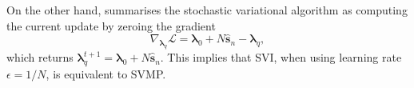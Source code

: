 \documentclass{article} %
\begin{document}
On the other hand, \cite{mandt:smoothedSVI} summarises the stochastic variational algorithm as computing the current update by zeroing the gradient
\begin{equation}
\nabla_{\bm{\lambda}_q} \mathcal{L} = \bm{\lambda}_0 + N \hat{\bm{s}}_n - \bm{\lambda}_q,
\end{equation}
which returns $\bm{\lambda}_q^{t+1} = \bm{\lambda}_0 + N \hat{\bm{s}}_n$. This implies that SVI, when using learning rate $\epsilon = 1/N$, is equivalent to SVMP. 

%
%
\end{document}
